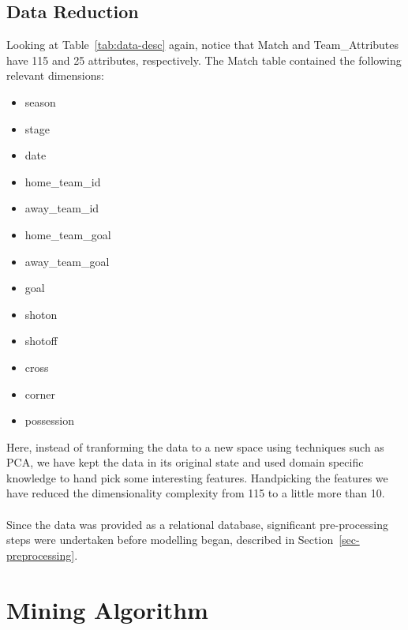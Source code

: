 \documentclass[11pt]{article}
\begin{document}
\subsection{Data Reduction}
Looking at Table~\ref{tab:data-desc} again, notice that Match and Team\_Attributes have 115 and 25 attributes, respectively.
The Match table contained the following relevant dimensions:
\begin{itemize}
  \setlength\itemsep{0em}
  \item season
  \item stage
  \item date
  \item home\_team\_id
  \item away\_team\_id
  \item home\_team\_goal
  \item away\_team\_goal
  \item goal
  \item shoton
  \item shotoff
  \item cross
  \item corner
  \item possession
\end{itemize}
Here, instead of tranforming the data to a new space using techniques such as PCA, we have kept the data in its original state and used domain specific knowledge to hand pick some interesting features. Handpicking the features we have reduced the dimensionality complexity from 115 to a little more than 10.
\\
\\
Since the data was provided as a relational database, significant pre-processing steps were undertaken before modelling began, described in Section~\ref{sec-preprocessing}.
\section{Mining Algorithm}




\end{document}

